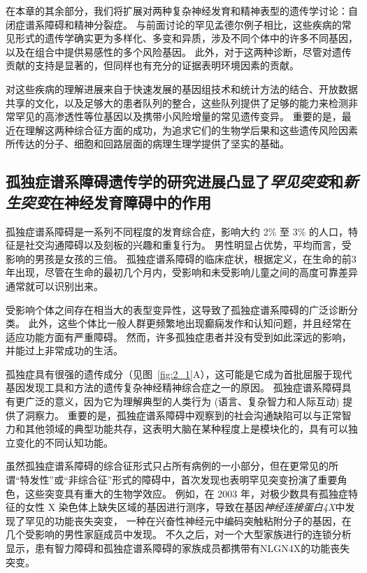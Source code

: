 在本章的其余部分，我们将扩展对两种复杂神经发育和精神表型的遗传学讨论：自闭症谱系障碍和精神分裂症。
与前面讨论的罕见孟德尔例子相比，这些疾病的常见形式的遗传学确实更为多样化、多变和异质，涉及不同个体中的许多不同基因，以及在组合中提供易感性的多个风险基因。
此外，对于这两种诊断，尽管对遗传贡献的支持是显著的，但同样也有充分的证据表明环境因素的贡献。


对这些疾病的理解进展来自于快速发展的基因组技术和统计方法的结合、开放数据共享的文化，以及足够大的患者队列的整合，这些队列提供了足够的能力来检测非常罕见的高渗透性等位基因以及携带小风险增量的常见遗传变异。
重要的是，最近在理解这两种综合征方面的成功，为追求它们的生物学后果和这些遗传风险因素所传达的分子、细胞和回路层面的病理生理学提供了坚实的基础。




\subsection{孤独症谱系障碍遗传学的研究进展凸显了\textit{罕见突变}和\textit{新生突变}在神经发育障碍中的作用}

孤独症谱系障碍是一系列不同程度的发育综合症，影响大约 2\% 至 3\% 的人口，特征是社交沟通障碍以及刻板的兴趣和重复行为。
男性明显占优势，平均而言，受影响的男孩是女孩的三倍。
孤独症谱系障碍的临床症状，根据定义，在生命的前3年出现，尽管在生命的最初几个月内，受影响和未受影响儿童之间的高度可靠差异通常就可以识别出来。



受影响个体之间存在相当大的表型变异性，这导致了孤独症谱系障碍的广泛诊断分类。
此外，这些个体比一般人群更频繁地出现癫痫发作和认知问题，并且经常在适应功能方面有严重障碍。
然而，许多孤独症患者并没有受到如此深远的影响，并能过上非常成功的生活。



孤独症具有很强的遗传成分（见图~\ref{fig:2_1}A），这可能是它成为首批屈服于现代基因发现工具和方法的遗传复杂神经精神综合症之一的原因。
孤独症谱系障碍具有更广泛的意义，因为它为理解典型的人类行为 (语言、复杂智力和人际互动) 提供了洞察力。
重要的是，孤独症谱系障碍中观察到的社会沟通缺陷可以与正常智力和其他领域的典型功能共存，这表明大脑在某种程度上是模块化的，具有可以独立变化的不同认知功能。


虽然孤独症谱系障碍的综合征形式只占所有病例的一小部分，但在更常见的所谓“特发性”或“非综合征”形式的障碍中，首次发现也表明罕见突变扮演了重要角色，这些突变具有重大的生物学效应。
例如，在 2003 年，对极少数具有孤独症特征的女性 X 染色体上缺失区域的基因进行测序，导致在基因\textit{神经连接蛋白4X}中发现了罕见的功能丧失突变， 一种在兴奋性神经元中编码突触粘附分子的基因，在几个受影响的男性家庭成员中发现。
不久之后，对一个大型家族进行的连锁分析显示，患有智力障碍和孤独症谱系障碍的家族成员都携带有NLGN4X的功能丧失突变。


